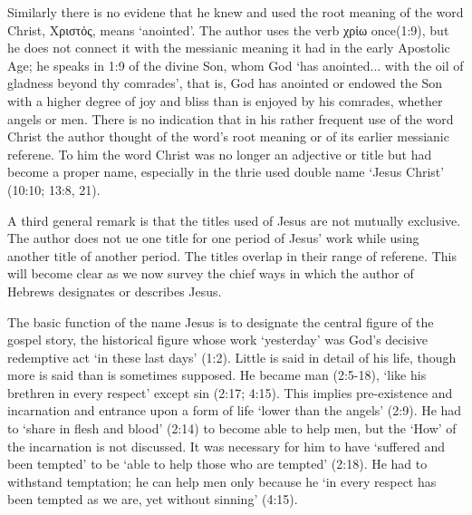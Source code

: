 \begin{enumerate}
          Similarly there is no evidene that he knew and used the root meaning
          of the word Christ, Χριστὀς, means `anointed'.
          The author uses the verb χρἰω once(1:9), but he does not connect it
          with the messianic meaning it had in the early Apostolic Age; he
          speaks in 1:9 of the divine Son, whom God `has anointed... with the
          oil of gladness beyond thy comrades', that is, God has anointed or
          endowed the Son with a higher degree of joy and bliss than is enjoyed
          by his comrades, whether angels or men.
          There is no indication that in his rather frequent use of the word
          Christ the author thought of the word's root meaning or of its earlier
          messianic referene.
          To him the word Christ was no longer an adjective or title but had
          become a proper name, especially in the thrie used double name `Jesus
          Christ' (10:10; 13:8, 21).
          \newline
          
          A third general remark is that the titles used of Jesus are not
          mutually exclusive.
          The author does not ue one title for one period of Jesus' work while
          using another title of another period.
          The titles overlap in their range of referene.
          This will become clear as we now survey the chief ways in which the
          author of Hebrews designates or describes Jesus.
          \newline

          The basic function of the name Jesus is to designate the central
          figure of the gospel story, the historical figure whose work
          `yesterday' was God's decisive redemptive act `in these last days'
          (1:2).
          Little is said in detail of his life, though more is said than is
          sometimes supposed.
          He became man (2:5-18), `like his brethren in every respect' except
          sin (2:17; 4:15).
          This implies pre-existence and incarnation and entrance upon a form of
          life `lower than the angels' (2:9).
          He had to `share in flesh and blood' (2:14) to become able to help
          men, but the `How' of the incarnation is not discussed.
          It was necessary for him to have `suffered and been tempted' to be
          `able to help those who are tempted' (2:18).
          He had to withstand temptation; he can help men only because he `in
          every respect has been tempted as we are, yet without sinning' (4:15).
          \newline


\end{enumerate}
